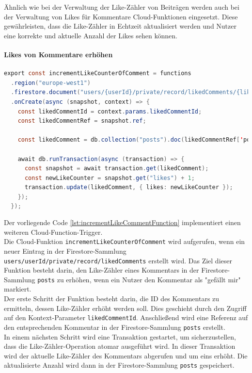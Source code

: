 Ähnlich wie bei der Verwaltung der Like-Zähler von Beiträgen werden auch bei der Verwaltung von Likes für Kommentare Cloud-Funktionen eingesetzt. Diese gewährleisten, dass die Like-Zähler in Echtzeit aktualisiert werden und Nutzer eine korrekte und aktuelle Anzahl der Likes sehen können.

\paragraph{Likes von Kommentare erhöhen}

\begin{lstlisting}[language=Java,caption=incrementLikeCounterOfComment Funktion,label=lst:incrementLikeCommentFunction]
  export const incrementLikeCounterOfComment = functions
  .region("europe-west1")
  .firestore.document("users/{userId}/private/record/likedComments/{likedCommentId}")
  .onCreate(async (snapshot, context) => {
    const likedCommentId = context.params.likedCommentId;
    const likedCommentRef = snapshot.ref;

    const likedComment = db.collection("posts").doc(likedCommentRef['post']).collection('comments').doc(likedCommentId);

    await db.runTransaction(async (transaction) => {
      const snapshot = await transaction.get(likedComment);
      const newLikeCounter = snapshot.get("likes") + 1;
      transaction.update(likedComment, { likes: newLikeCounter });
    });
  });
\end{lstlisting}

Der vorliegende Code \ref{lst:incrementLikeCommentFunction} implementiert einen weiteren Cloud-Function-Trigger.
\\
Die Cloud-Funktion \texttt{incrementLikeCounterOfComment} wird aufgerufen, wenn ein neuer Eintrag in der Firestore-Sammlung \texttt{users/{userId}/private/record/likedComments} erstellt wird. Das Ziel dieser Funktion besteht darin, den Like-Zähler eines Kommentars in der Firestore-Sammlung \texttt{posts} zu erhöhen, wenn ein Nutzer den Kommentar als "gefällt mir" markiert.
\\
Der erste Schritt der Funktion besteht darin, die ID des Kommentars zu ermitteln, dessen Like-Zähler erhöht werden soll. Dies geschieht durch den Zugriff auf den Kontext-Parameter \texttt{likedCommentId}. Anschließend wird eine Referenz auf den entsprechenden Kommentar in der Firestore-Sammlung \texttt{posts} erstellt.
\\
In einem nächsten Schritt wird eine Transaktion gestartet, um sicherzustellen, dass die Like-Zähler-Operation atomar ausgeführt wird. In dieser Transaktion wird der aktuelle Like-Zähler des Kommentars abgerufen und um eins erhöht. Die aktualisierte Anzahl wird dann in der Firestore-Sammlung \texttt{posts} gespeichert.

